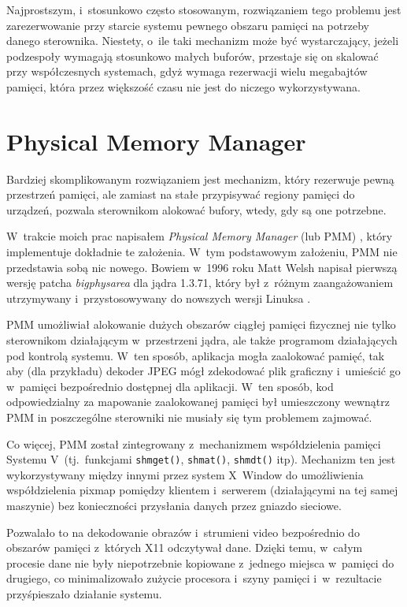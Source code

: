 Najprostszym, i~stosunkowo często stosowanym, rozwiązaniem tego
problemu jest zarezerwowanie przy starcie systemu pewnego obszaru
pamięci na potrzeby danego sterownika.  Niestety, o~ile taki mechanizm
może być wystarczający, jeżeli podzespoły wymagają stosunkowo małych
buforów, przestaje się on skalować przy współczesnych systemach, gdyż
wymaga rezerwacji wielu megabajtów pamięci, która przez większość
czasu nie jest do niczego wykorzystywana.

\section{Physical Memory Manager}\label{sec:pmm}

Bardziej skomplikowanym rozwiązaniem jest mechanizm, który rezerwuje
pewną przestrzeń pamięci, ale zamiast na stałe przypisywać regiony
pamięci do urządzeń, pozwala sterownikom alokować bufory, wtedy, gdy
są one potrzebne.

W~trakcie moich prac napisałem {\it Physical Memory Manager} (lub PMM)
\cite{patch:pmm}, który implementuje dokładnie te założenia. W~tym
podstawowym założeniu, PMM nie przedstawia sobą nic nowego.  Bowiem
w~1996 roku Matt Welsh napisał pierwszą wersję patcha
\emph{bigphysarea} dla jądra 1.3.71, który był z~różnym zaangażowaniem
utrzymywany i~przystosowywany do nowszych wersji Linuksa
\cite{patch:bigphys}.

PMM umożliwiał alokowanie dużych obszarów ciągłej pamięci fizycznej
nie tylko sterownikom działającym w~przestrzeni jądra, ale także
programom działających pod kontrolą systemu.  W~ten sposób, aplikacja
mogła zaalokować pamięć, tak aby (dla przykładu) dekoder JPEG mógł
zdekodować plik graficzny i~umieścić go w~pamięci bezpośrednio
dostępnej dla aplikacji.  W~ten sposób, kod odpowiedzialny za
mapowanie zaalokowanej pamięci był umieszczony wewnątrz PMM in
poszczególne sterowniki nie musiały się tym problemem zajmować.

Co więcej, PMM został zintegrowany z~mechanizmem współdzielenia
pamięci Systemu V~(tj.\ funkcjami \lstinline|shmget()|,
\lstinline|shmat()|, \lstinline|shmdt()| itp).  Mechanizm ten jest
wykorzystywany między innymi przez system X~Window do umożliwienia
współdzielenia pixmap pomiędzy klientem i~serwerem (działającymi na
tej samej maszynie) bez konieczności przysłania danych przez gniazdo
sieciowe.

Pozwalało to na dekodowanie obrazów i~strumieni video bezpośrednio do
obszarów pamięci z~których X11 odczytywał dane.  Dzięki temu, w~całym
procesie dane nie były niepotrzebnie kopiowane z~jednego miejsca
w~pamięci do drugiego, co minimalizowało zużycie procesora i~szyny
pamięci i~w~rezultacie przyśpieszało działanie systemu.

